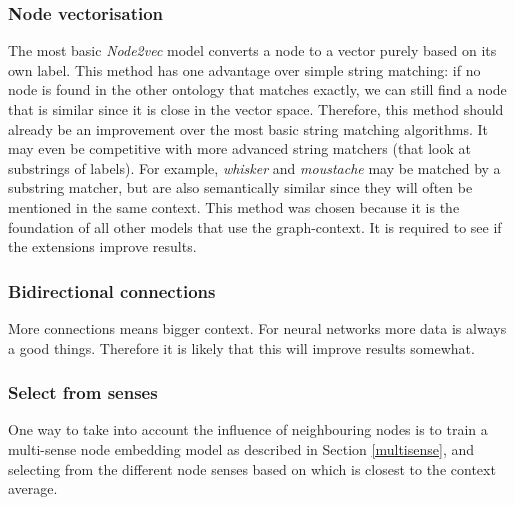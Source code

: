 \documentclass{article}
\begin{document}
  \subsubsection{Node vectorisation}
  The most basic \emph{Node2vec} model converts a node to a vector purely based on its own label. This method has one advantage over simple string matching: if no node is found in the other ontology that matches exactly, we can still find a node that is similar since it is close in the vector space. Therefore, this method should already be an improvement over the most basic string matching algorithms. It may even be competitive with more advanced string matchers (that look at substrings of labels). For example, \emph{whisker} and \emph{moustache} may be matched by a substring matcher, but are also semantically similar since they will often be mentioned in the same context.
  This method was chosen because it is the foundation of all other models that use the graph-context. It is required to see if the extensions improve results.
  \subsubsection{Bidirectional connections}
  More connections means bigger context. For neural networks more data is always a good things. Therefore it is likely that this will improve results somewhat.
  \subsubsection{Select from senses}
  One way to take into account the influence of neighbouring nodes is to train a multi-sense node embedding model as described in Section \ref{multisense}, and selecting from the different node senses based on which is closest to the context average.
\end{document}
